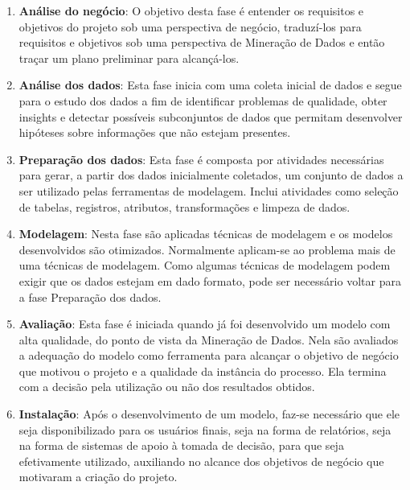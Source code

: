 \begin{enumerate}

\item \textbf{Análise do negócio}:
O objetivo desta fase é entender os requisitos e objetivos do projeto sob uma perspectiva de negócio, traduzí-los para requisitos e objetivos sob uma perspectiva de Mineração de Dados e então traçar um plano preliminar para alcançá-los.

\item \textbf{Análise dos dados}:
Esta fase inicia com uma coleta inicial de dados e segue para o estudo dos dados a fim de identificar problemas de qualidade, obter insights e detectar possíveis subconjuntos de dados que permitam desenvolver hipóteses sobre informações que não estejam presentes.

\item \textbf{Preparação dos dados}:
Esta fase é composta por atividades necessárias para gerar, a partir dos dados inicialmente coletados, um conjunto de dados a ser utilizado pelas ferramentas de modelagem. Inclui atividades como seleção de tabelas, registros, atributos, transformações e limpeza de dados.

\item \textbf{Modelagem}:
Nesta fase são aplicadas técnicas de modelagem e os modelos desenvolvidos são otimizados. Normalmente aplicam-se ao problema mais de uma técnicas de modelagem. Como algumas técnicas de modelagem podem exigir que os dados estejam em dado formato, pode ser necessário voltar para a fase Preparação dos dados.

\item \textbf{Avaliação}:
Esta fase é iniciada quando já foi desenvolvido um modelo com alta qualidade, do ponto de vista da Mineração de Dados. Nela são avaliados a adequação do modelo como ferramenta para alcançar o objetivo de negócio que motivou o projeto e a qualidade da instância do processo. Ela termina com a decisão pela utilização ou não dos resultados obtidos.

\item \textbf{Instalação}:
Após o desenvolvimento de um modelo, faz-se necessário que ele seja disponibilizado para os usuários finais, seja na forma de relatórios, seja na forma de sistemas de apoio à tomada de decisão, para que seja efetivamente utilizado, auxiliando no alcance dos objetivos de negócio que motivaram a criação do projeto.

\end{enumerate}

